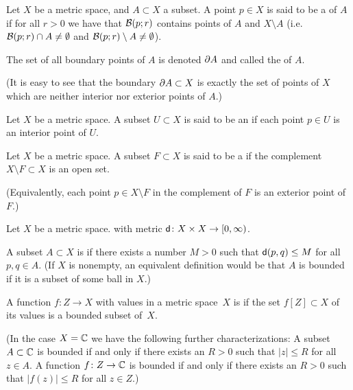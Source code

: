 \begin{definition}[Boundary]
  \label{def:boundary}
  Let $X$ be a metric space, and $A \subset X$ a subset.
  A point $p \in X$ is said to be a  of $A$
  if for all $r > 0$ we have that $\BallRC{r}{p}$ contains points
  of $A$ and $X \setminus A$ (i.e. $\BallRC{r}{p} \cap A \ne \emptyset$
  and $\BallRC{r}{p} \setminus A \ne \emptyset$).

  The set of all boundary points of $A$ is denoted $\bdry A$ and called the
   of $A$.

  (It is easy to see that the boundary $\bdry A \subset X$ is exactly
  the set of points of $X$ which are neither interior nor exterior points
  of $A$.)
\end{definition}

\begin{definition}
  \label{def:open_set}
  Let $X$ be a metric space.
  A subset $U \subset X$ is said to be an  if
  each point $p \in U$ is an interior point of $U$.
\end{definition}

\begin{definition}
  \label{def:closed_set}
  Let $X$ be a metric space.
  A subset $F \subset X$ is said to be a  if
  the complement $X \setminus F \subset X$ is an open set.

  (Equivalently, each point $p \in X \setminus F$ in the complement
  of $F$ is an exterior point of $F$.)
\end{definition}

\begin{definition}[Boundedness]
  \label{def:bounded}
  Let $X$ be a metric space.
  with metric $\genmet \colon X \times X \to [0,\infty)$.

  A subset $A \subset X$ is  if there exists
  a number $M>0$ such that $\genmet(p,q) \le M$ for all $p,q \in A$.
  (If $X$ is nonempty, an equivalent definition would be that
  $A$ is bounded if it is a subset of some ball in $X$.)

  A function $f \colon Z \to X$ with values in a metric space~$X$
  is  if the set $f[Z] \subset X$ of its values is a
  bounded subset of~$X$.

  (In the case $X = \bC$ we have the following further characterizations:
  A subset $A \subset \bC$ is bounded if and only if there exists an $R>0$
  such that $|z| \le R$ for all $z \in A$. A function $f \colon Z \to \bC$
  is bounded if and only if there exists an $R>0$ such that $|f(z)| \le R$
  for all $z \in Z$.)
\end{definition}



